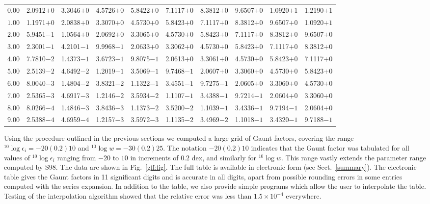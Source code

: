 \documentclass[useAMS,usenatbib]{mn2e}
\begin{document}
\begin{table}
\begin{tabular}{rrrrrrrrrr}
$ 0.00$ & 2.0912$+0$ & 3.3046$+0$ & 4.5726$+0$ & 5.8422$+0$ & 7.1117$+0$ & 8.3812$+0$ & 9.6507$+0$ & 1.0920$+1$ & 1.2190$+1$ \\
$ 1.00$ & 1.1971$+0$ & 2.0838$+0$ & 3.3070$+0$ & 4.5730$+0$ & 5.8423$+0$ & 7.1117$+0$ & 8.3812$+0$ & 9.6507$+0$ & 1.0920$+1$ \\
$ 2.00$ & 5.9451$-1$ & 1.0564$+0$ & 2.0692$+0$ & 3.3065$+0$ & 4.5730$+0$ & 5.8423$+0$ & 7.1117$+0$ & 8.3812$+0$ & 9.6507$+0$ \\
$ 3.00$ & 2.3001$-1$ & 4.2101$-1$ & 9.9968$-1$ & 2.0633$+0$ & 3.3062$+0$ & 4.5730$+0$ & 5.8423$+0$ & 7.1117$+0$ & 8.3812$+0$ \\
$ 4.00$ & 7.7810$-2$ & 1.4373$-1$ & 3.6723$-1$ & 9.8075$-1$ & 2.0613$+0$ & 3.3061$+0$ & 4.5730$+0$ & 5.8423$+0$ & 7.1117$+0$ \\
$ 5.00$ & 2.5139$-2$ & 4.6492$-2$ & 1.2019$-1$ & 3.5069$-1$ & 9.7468$-1$ & 2.0607$+0$ & 3.3060$+0$ & 4.5730$+0$ & 5.8423$+0$ \\
$ 6.00$ & 8.0040$-3$ & 1.4804$-2$ & 3.8321$-2$ & 1.1322$-1$ & 3.4551$-1$ & 9.7275$-1$ & 2.0605$+0$ & 3.3060$+0$ & 4.5730$+0$ \\
$ 7.00$ & 2.5365$-3$ & 4.6917$-3$ & 1.2146$-2$ & 3.5934$-2$ & 1.1107$-1$ & 3.4388$-1$ & 9.7214$-1$ & 2.0604$+0$ & 3.3060$+0$ \\
$ 8.00$ & 8.0266$-4$ & 1.4846$-3$ & 3.8436$-3$ & 1.1373$-2$ & 3.5200$-2$ & 1.1039$-1$ & 3.4336$-1$ & 9.7194$-1$ & 2.0604$+0$ \\
$ 9.00$ & 2.5388$-4$ & 4.6959$-4$ & 1.2157$-3$ & 3.5972$-3$ & 1.1135$-2$ & 3.4969$-2$ & 1.1018$-1$ & 3.4320$-1$ & 9.7188$-1$ \\
\hline
\end{tabular}
\end{table}

Using the procedure outlined in the previous sections we computed a large grid
of Gaunt factors, covering the range ${}^{10}\log\epsilon_i = -20 (0.2) 10$
and ${}^{10}\log w = -30 (0.2) 25$. The notation $-20 (0.2) 10$ indicates that
the Gaunt factor was tabulated for all values of ${}^{10}\log\epsilon_i$
ranging from $-20$ to $10$ in increments of $0.2$ dex, and similarly for
${}^{10}\log w$. This range vastly extends the parameter range computed by
S98. The data are shown in Fig.~\ref{gff:fig}. The full table is available in
electronic form (see Sect.~\ref{summary}). The electronic table gives the
Gaunt factors in 11 significant digits and is accurate in all digits, apart
from possible rounding errors in some entries computed with the series
expansion. In addition to the table, we also provide simple programs which
allow the user to interpolate the table. Testing of the interpolation
algorithm showed that the relative error was less than $1.5\times10^{-4}$
everywhere.
\end{document}
